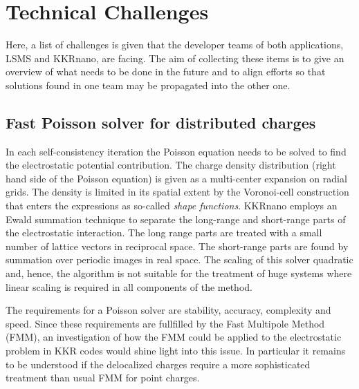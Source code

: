 \documentclass{llncs}
\def\KKRnano{{KKRnano}}
\def\LSMS{{LSMS}}
\begin{document}
\section{Technical Challenges} \label{section:tech}

Here, a list of challenges is given that the developer teams of both applications, \LSMS{} and \KKRnano{}, are
facing. The aim of collecting these items is to give an overview of what needs to be done in the future
and to align efforts so that solutions found in one team may be propagated into the other one.

\subsection{Fast Poisson solver for distributed charges} %
In each self-consistency iteration the Poisson equation needs to be solved to find the
electrostatic potential contribution. The charge density distribution (right hand side of the Poisson equation)
is given as a multi-center expansion on radial grids. The density is limited in its spatial extent
by the Voronoi-cell construction that enters the expressions as so-called \emph{shape functions}.
\KKRnano{} employs an Ewald summation technique to separate the long-range and short-range parts of the electrostatic interaction.
The long range parts are treated with a small number of lattice vectors in reciprocal space. The short-range parts
are found by summation over periodic images in real space.
The scaling of this solver quadratic %
and, hence, the algorithm is not suitable
for the treatment of huge systems where linear scaling is required in all components of the method.

The requirements for a Poisson solver are stability, accuracy, complexity and speed.
Since these requirements are fullfilled by the Fast Multipole Method (FMM), 
an investigation of how the FMM could be applied to the
electrostatic problem in KKR codes would shine light into this issue.
In particular it remains to be understood if the delocalized charges require a more
sophisticated treatment than usual FMM for point charges.
\end{document}
